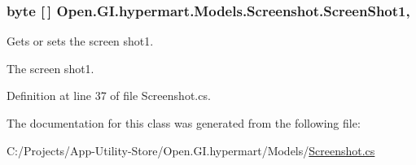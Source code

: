 \subsubsection[{Screen\+Shot1}]{\setlength{\rightskip}{0pt plus 5cm}byte \mbox{[}$\,$\mbox{]} Open.\+G\+I.\+hypermart.\+Models.\+Screenshot.\+Screen\+Shot1\hspace{0.3cm}{\ttfamily [get]}, {\ttfamily [set]}}\label{class_open_1_1_g_i_1_1hypermart_1_1_models_1_1_screenshot_a435ca1863d66de2de497d603585610d8}


Gets or sets the screen shot1. 

The screen shot1. 

Definition at line 37 of file Screenshot.\+cs.



The documentation for this class was generated from the following file\+:\begin{DoxyCompactItemize}
\item 
C\+:/\+Projects/\+App-\/\+Utility-\/\+Store/\+Open.\+G\+I.\+hypermart/\+Models/\hyperlink{_models_2_screenshot_8cs}{Screenshot.\+cs}\end{DoxyCompactItemize}
